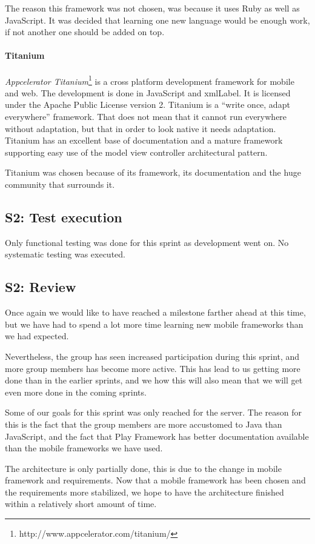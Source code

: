 \documentclass[11pt]{book}
\begin{document}
The reason this framework was not chosen, was because it uses Ruby as well as JavaScript. It was decided that learning one new language would be enough work, if not another one should be added on top.

\paragraph{Titanium}
\emph{Appcelerator Titanium}\footnote{http://www.appcelerator.com/titanium/} is a cross platform development framework for mobile and web. The development is done in JavaScript and \gls{xmlLabel}. It is licensed under the Apache Public License version 2. Titanium is a ``write once, adapt everywhere'' framework.\cite{titaniumCrossMobile} That does not mean that it cannot run everywhere without adaptation, but that in order to look native it needs adaptation. Titanium has an excellent base of documentation and a mature framework supporting easy use of the model view controller architectural pattern.

Titanium was chosen because of its framework, its documentation and the huge community that surrounds it.


\subsection{S2: Test execution}
Only functional testing was done for this sprint as development went on. No systematic testing was executed.

\subsection{S2: Review}
Once again we would like to have reached a milestone farther ahead at this time, but we have had to spend a lot more time learning new mobile frameworks than we had expected. 

Nevertheless, the group has seen increased participation during this sprint, and more group members has become more active. This has lead to us getting more done than in the earlier sprints, and we how this will also mean that we will get even more done in the coming sprints.

Some of our goals for this sprint was only reached for the server. The reason for this is the fact that the group members are more accustomed to Java than JavaScript, and the fact that Play Framework has better documentation available than the mobile frameworks we have used.

The architecture is only partially done, this is due to the change in mobile framework and requirements. Now that a mobile framework has been chosen and the requirements more stabilized, we hope to have the architecture finished within a relatively short amount of time.
\end{document}
